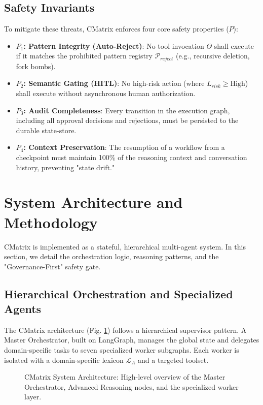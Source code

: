 \documentclass[conference]{IEEEtran}
\begin{document}
\subsection{Safety Invariants}
To mitigate these threats, CMatrix enforces four core safety properties ($P$):
\begin{itemize}
    \item \textbf{$P_1$: Pattern Integrity (Auto-Reject)}: No tool invocation $\Theta$ shall execute if it matches the prohibited pattern registry $\mathcal{P}_{reject}$ (e.g., recursive deletion, fork bombs).
    \item \textbf{$P_2$: Semantic Gating (HITL)}: No high-risk action (where $L_{risk} \geq \text{High}$) shall execute without asynchronous human authorization.
    \item \textbf{$P_3$: Audit Completeness}: Every transition in the execution graph, including all approval decisions and rejections, must be persisted to the durable state-store.
    \item \textbf{$P_4$: Context Preservation}: The resumption of a workflow from a checkpoint must maintain 100\% of the reasoning context and conversation history, preventing "state drift."
\end{itemize}

\section{System Architecture and Methodology}
\label{sec:methodology}

CMatrix is implemented as a stateful, hierarchical multi-agent system. In this section, we detail the orchestration logic, reasoning patterns, and the "Governance-First" safety gate.

\subsection{Hierarchical Orchestration and Specialized Agents}
The CMatrix architecture (Fig. \ref{fig:architecture}) follows a hierarchical supervisor pattern. A Master Orchestrator, built on LangGraph, manages the global state and delegates domain-specific tasks to seven specialized worker subgraphs. Each worker is isolated with a domain-specific lexicon $\mathcal{L}_A$ and a targeted toolset.

\begin{figure}[t]
\centering

\caption{CMatrix System Architecture: High-level overview of the Master Orchestrator, Advanced Reasoning nodes, and the specialized worker layer.}
\label{fig:architecture}
\end{figure}
\end{document}
